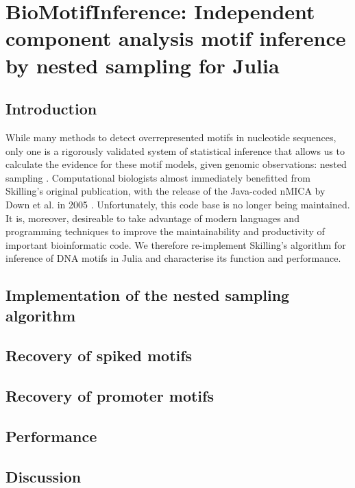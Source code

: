 \chapter{BioMotifInference: Independent component analysis motif inference by nested sampling for Julia}
\section{Introduction}
While many methods to detect overrepresented motifs in nucleotide sequences, only one is a rigorously validated system of statistical inference that allows us to calculate the evidence for these motif models, given genomic observations: nested sampling \cite{Skilling2006}. Computational biologists almost immediately benefitted from Skilling's original publication, with the release of the Java-coded nMICA by Down et al. in 2005 \cite{Down2005}. Unfortunately, this code base is no longer being maintained. It is, moreover, desireable to take advantage of modern languages and programming techniques to improve the maintainability and productivity of important bioinformatic code. We therefore re-implement Skilling's algorithm for inference of DNA motifs in Julia \cite{Bezanson2015} and characterise its function and performance.

\section{Implementation of the nested sampling algorithm}

\section{Recovery of spiked motifs}

\section{Recovery of promoter motifs}

\section{Performance}

\section{Discussion}